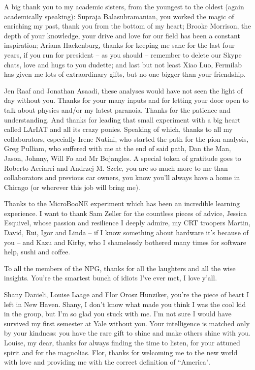 \documentclass[letterpaper,12pt]{yalephd}
\begin{document}
A big thank you to my academic sisters, from the youngest to the oldest (again academically speaking): Supraja Balasubramanian, you worked the magic of enriching my past, thank you from the bottom of my heart;  Brooke Morrison, the depth of your knowledge, your drive and love for our field has been a constant inspiration;  Ariana  Hackenburg, thanks for keeping me sane for the last four years, if you run for president -- as you should -- remember to delete our Skype chats, love and hugs to you dudette; and last but not least Xiao Luo, Fermilab has given me lots of extraordinary gifts, but no one  bigger than your friendship. 

Jen Raaf and Jonathan Asaadi, these analyses would have not seen the light of day without you. Thanks for your many inputs and for letting your door open to talk about physics and/or my latest paranoia. Thanks for the patience and understanding. And thanks for leading that small experiment with a big heart called LArIAT and all its crazy ponies. Speaking of which, thanks to all my collaborators, especially Irene Nutini, who started the path for the pion analysis, Greg Pulliam, who suffered with me at the end of said path, Dan the Man, Jason, Johnny, Will Fo and Mr Bojangles. A special token of gratitude goes to Roberto Acciarri and Andrzej M. Szelc, you are so much more to me than collaborators and previous car owners, you know you'll always have a home in Chicago (or wherever this job will bring me).

Thanks to the MicroBooNE experiment which has been an incredible learning experience.  I want to thank  Sam Zeller for the countless pieces of advice, Jessica Esquivel, whose passion and resilience I deeply admire,  my CRT troopers Martin, David, Rui, Igor and Linda  -- if I know something about hardware it's because of you -- and Kazu and  Kirby, who I shamelessly bothered many times for software help, sushi and coffee.

To all the members of the NPG, thanks for all the laughters and all the wise insights. You're the smartest bunch of idiots I've ever met, I love y'all.

Shany Danieli, Louise Laage and Flor Orosz Hunziker, you're the piece of heart I left in New Haven. Shany, I don't know what made you think I was the cool kid in the group, but I'm so glad you stuck with me. I'm not sure I would have survived my first semester at Yale without you. Your intelligence is matched only by your kindness: you have the rare gift to shine and make others shine with you. Louise, my dear, thanks for always finding the time to listen, for your attuned spirit and for the magnolias. Flor, thanks for welcoming me to the new world with love and providing me with the correct definition of ``America".
\end{document}
